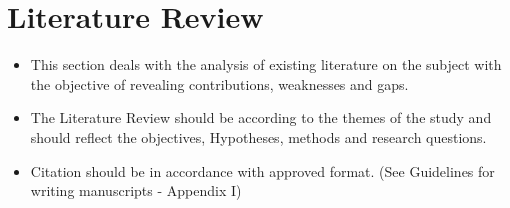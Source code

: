 \section{Literature Review}

\begin{itemize}
    \item This section deals with the analysis of existing literature on the subject with the
    objective of revealing contributions, weaknesses and gaps.
    \item The Literature Review should be according to the themes of the study and should
    reflect the objectives, Hypotheses, methods and research questions.
    \item Citation should be in accordance with approved format. (See
    Guidelines for writing manuscripts - Appendix I)
\end{itemize}
